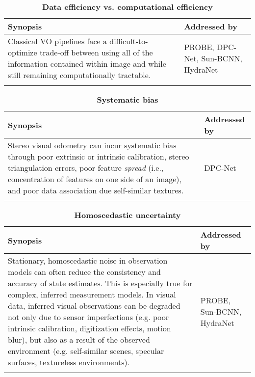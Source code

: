 \begin{table}[h!]
	\caption{\textbf{Data efficiency vs. computational efficiency}}	\begin{threeparttable}
	\begin{tabular}{m{}m{}}
		\toprule
		\textbf{Synopsis} & \textbf{Addressed by} \\ \midrule  
		Classical VO pipelines face a difficult-to-optimize trade-off between using all of the information contained within image and while still remaining computationally tractable.  & PROBE, DPC-Net, Sun-BCNN, HydraNet \\
		& \\
		\bottomrule
	\end{tabular}
\end{threeparttable}
\end{table}


\begin{table}[h!]
	\caption{\textbf{Systematic bias}}
	\begin{threeparttable}
	\begin{tabular}{m{}m{}}
		\toprule
		\textbf{Synopsis} & \textbf{Addressed by} \\ \midrule  
		Stereo visual odometry can incur systematic bias through poor extrinsic or intrinsic calibration, stereo triangulation errors, poor feature \textit{spread} (i.e., concentration of features on one side of an image), and poor data association due self-similar textures. &  DPC-Net \\
		& \\
		\bottomrule
	\end{tabular}
\end{threeparttable}
\end{table}


\begin{table}[h!]
	\caption{\textbf{Homoscedastic uncertainty}}
	\begin{threeparttable}
	\begin{tabular}{m{}m{}}
		\toprule
		\textbf{Synopsis} & \textbf{Addressed by} \\ \midrule  
		Stationary, homoscedastic noise in observation models can often reduce the consistency and accuracy of state estimates. This is especially true for complex, inferred measurement models. In visual data, inferred visual observations can be degraded not only due to sensor imperfections (e.g. poor intrinsic calibration, digitization effects, motion blur), but also as a result of the observed environment (e.g. self-similar scenes, specular surfaces, textureless environments). &  PROBE, Sun-BCNN, HydraNet \\
		& \\
		\bottomrule
	\end{tabular}
\end{threeparttable}
\end{table}

